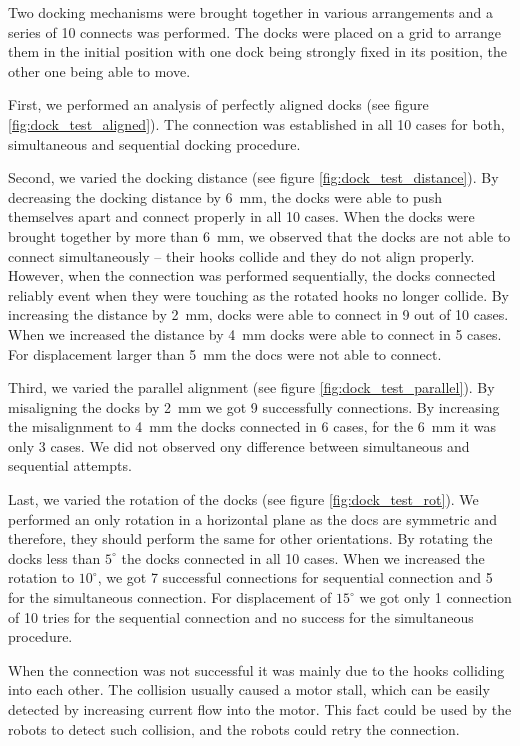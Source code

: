 Two docking mechanisms were brought together in various arrangements and a
series of 10 connects was performed. The docks were placed on a grid to arrange
them in the initial position with one dock being strongly fixed in its position,
the other one being able to move.

First, we performed an analysis of perfectly aligned docks (see figure
\ref{fig:dock_test_aligned}). The connection was established in all 10 cases for
both, simultaneous and sequential docking procedure.

Second, we varied the docking distance (see figure
\ref{fig:dock_test_distance}). By decreasing the docking distance by 6~mm, the
docks were able to push themselves apart and connect properly in all 10 cases.
When the docks were brought together by more than 6~mm, we observed that the
docks are not able to connect simultaneously -- their hooks collide and they do
not align properly. However, when the connection was performed sequentially, the
docks connected reliably event when they were touching as the rotated hooks no
longer collide. By increasing the distance by 2~mm, docks were able to connect
in 9 out of 10 cases. When we increased the distance by 4~mm docks were able to
connect in 5 cases. For displacement larger than 5~mm the docs were not able to
connect.

Third, we varied the parallel alignment (see figure
\ref{fig:dock_test_parallel}). By misaligning the docks by 2~mm we got 9
successfully connections. By increasing the misalignment to 4~mm the docks
connected in 6 cases, for the 6~mm it was only 3 cases. We did not observed ony
difference between simultaneous and sequential attempts.

Last, we varied the rotation of the docks (see figure \ref{fig:dock_test_rot}).
We performed an only rotation in a horizontal plane as the docs are symmetric
and therefore, they should perform the same for other orientations. By rotating
the docks less than $5^\circ$ the docks connected in all 10 cases. When we
increased the rotation to $10^\circ$, we got 7 successful connections for
sequential connection and 5 for the simultaneous connection. For displacement of
$15^\circ$ we got only 1 connection of 10 tries for the sequential connection
and no success for the simultaneous procedure.

When the connection was not successful it was mainly due to the hooks colliding
into each other. The collision usually caused a motor stall, which can be easily
detected by increasing current flow into the motor. This fact could be used by the
robots to detect such collision, and the robots could retry the connection.

